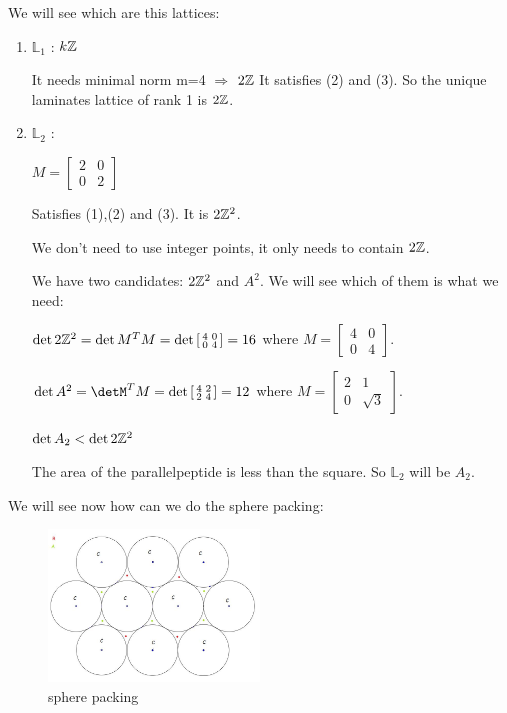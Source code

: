 We will see which are this lattices:

\begin{enumerate}
\item $\mathbb{L}_1$ : $k\mathbb{Z}$

It needs minimal norm m=4 $\Rightarrow$ $2\mathbb{Z}$ 
It satisfies (2) and (3).
So the unique laminates lattice of rank 1 is $2\mathbb{Z}$.


\item $\mathbb{L}_2$ :

$M=\left[\begin{smallmatrix}
2 & 0 \\
0 & 2\end{smallmatrix}\right]$ 

Satisfies (1),(2) and (3). It is $2\mathbb{Z}^{2}$.


We don't need to use integer points, it only needs to contain $2\mathbb{Z}$.

We have two candidates:  $2\mathbb{Z}^{2}$ and $A^{2}$. We will see which of them is what we need:

$\det 2\mathbb{Z}^{2}=\det M^{T}M=\det\left[\begin{smallmatrix}
4 & 0 \\
0 & 4 \end{smallmatrix}\right]=16$ where $M=\left[\begin{smallmatrix}
4 & 0 \\
0 & 4 \end{smallmatrix}\right]$.

$\det A^{2}=\detM^{T}M=\det\left[\begin{smallmatrix}
4 & 2 \\
2 & 4 \end{smallmatrix}\right]=12$ where $M=\left[\begin{smallmatrix}
2 & 1 \\
0 & \sqrt{3} \end{smallmatrix}\right]$.


$\det A_2 < \det 2\mathbb{Z}^{2}$

The area of the parallelpeptide is less than the square. So $\mathbb{L}_2$ will be $A_2$.
\end{enumerate}
We will see now how can we do the sphere packing:

\begin{figure}[htbp]
\centering
\includegraphics[width=0.5\textwidth]{apunteslattice}
\caption{sphere packing}
\end{figure}


